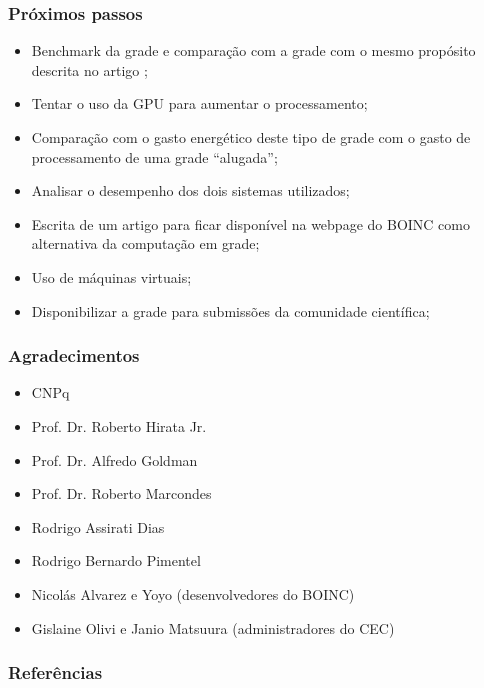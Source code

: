 \documentclass{beamer}
\begin{document}
\begin{frame}
  \frametitle{Próximos passos}
  \begin{itemize}
    \item Benchmark da grade e comparação com a grade com o mesmo propósito descrita no artigo \cite{Dias};
    \item Tentar o uso da GPU para aumentar o processamento;
    \item Comparação com o gasto energético deste tipo de grade com o gasto de processamento de uma grade ``alugada'';
    \item Analisar o desempenho dos dois sistemas utilizados;
    \item Escrita de um artigo para ficar disponível na webpage do BOINC como alternativa da computação em grade;
    \item Uso de máquinas virtuais; 
    \item Disponibilizar a grade para submissões da comunidade científica;
  \end{itemize}
\end{frame}



\begin{frame}
  \frametitle{Agradecimentos}
  \begin{itemize}
    \item CNPq
    \item Prof. Dr. Roberto Hirata Jr.
    \item Prof. Dr. Alfredo Goldman
    \item Prof. Dr. Roberto Marcondes
    \item Rodrigo Assirati Dias
    \item Rodrigo Bernardo Pimentel
    \item Nicolás Alvarez e Yoyo (desenvolvedores do BOINC)
    \item Gislaine Olivi e Janio Matsuura (administradores do CEC)
  \end{itemize}
\end{frame}

\begin{frame}
  \frametitle{Referências}
  
  
\end{frame}
\end{document}
